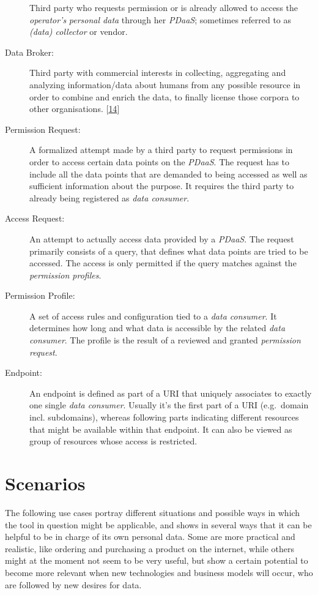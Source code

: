 \documentclass[12pt,english,a4paper,titlepage,cleardoublepage=empty,dottedtoc]{report}
\begin{document}
\begin{description}
Third party who requests permission or is already allowed to access the
\emph{operator's} \emph{personal data} through her \emph{PDaaS};
sometimes referred to as \emph{(data) collector} or vendor.
\item[\protect\hypertarget{terminologies--data-broker}{}{Data Broker}:]
Third party with commercial interests in collecting, aggregating and
analyzing information/data about humans from any possible resource in
order to combine and enrich the data, to finally license those corpora
to other organisations.
{[}\protect\hyperlink{ref-report_2014_data-brokers}{14}{]}
\item[Permission Request:]
A formalized attempt made by a third party to request permissions in
order to access certain data points on the \emph{PDaaS}. The request has
to include all the data points that are demanded to being accessed as
well as sufficient information about the purpose. It requires the third
party to already being registered as \emph{data consumer}.
\item[Access Request:]
An attempt to actually access data provided by a \emph{PDaaS}. The
request primarily consists of a query, that defines what data points are
tried to be accessed. The access is only permitted if the query matches
against the \emph{permission profiles}.
\item[Permission Profile:]
A set of access rules and configuration tied to a \emph{data consumer}.
It determines how long and what data is accessible by the related
\emph{data consumer}. The profile is the result of a reviewed and
granted \emph{permission request}.
\item[Endpoint:]
An endpoint is defined as part of a URI that uniquely associates to
exactly one single \emph{data consumer}. Usually it's the first part of
a URI (e.g.~domain incl. subdomains), whereas following parts indicating
different resources that might be available within that endpoint. It can
also be viewed as group of resources whose access is restricted.
\end{description}

\hypertarget{scenarios}{\section{Scenarios}\label{scenarios}}

The following use cases portray different situations and possible ways
in which the tool in question might be applicable, and shows in several
ways that it can be helpful to be in charge of its own personal data.
Some are more practical and realistic, like ordering and purchasing a
product on the internet, while others might at the moment not seem to be
very useful, but show a certain potential to become more relevant when
new technologies and business models will occur, who are followed by new
desires for data.
\end{document}
